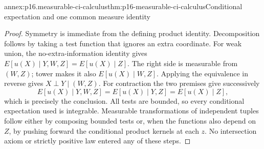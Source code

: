 \begin{annexitem}{annex:p16.measurable-ci-calculus}{thm:p16-measurable-ci-calculus}{Conditional expectation and one common measure identity}
\begin{proof}
Symmetry is immediate from the defining product identity. Decomposition
follows by taking a test function that ignores an extra coordinate.
For weak union, the no-extra-information identity gives
\(E[u(X)\mid Y,W,Z]=E[u(X)\mid Z]\). The right side is measurable
from \((W,Z)\); tower makes it also \(E[u(X)\mid W,Z]\).
Applying the equivalence in reverse gives \(X\perp Y\mid(W,Z)\).
For contraction the two premises give successively
\[
 E[u(X)\mid Y,W,Z]=E[u(X)\mid Y,Z]=E[u(X)\mid Z],
\]
which is precisely the conclusion. All tests are bounded, so every
conditional expectation used is integrable. Measurable transformations
of independent tuples follow either by composing bounded tests or,
when the functions also depend on \(Z\), by pushing forward the
conditional product kernels at each \(z\). No intersection axiom or
strictly positive law entered any of these steps.
\end{proof}
\end{annexitem}

